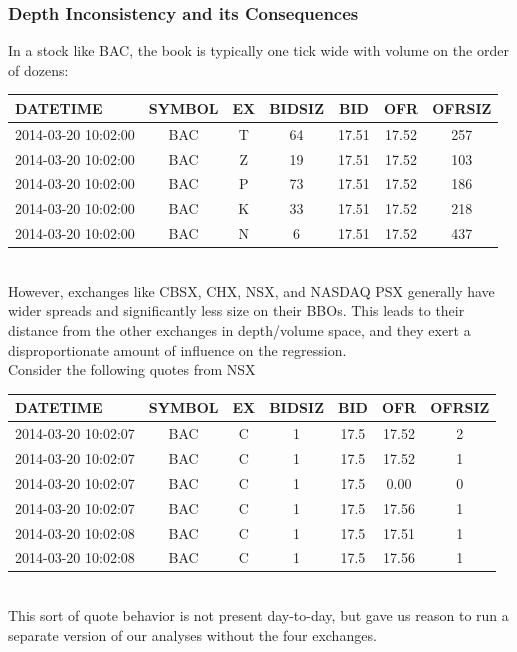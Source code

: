 \documentclass{article}
\begin{document}
\subsubsection{Depth Inconsistency and its Consequences}
In a stock like BAC, the book is typically one tick wide with volume on the order of dozens:\\
\begin{tabular}{ | l | c | c | c | c | c | c |}
\hline
DATETIME & SYMBOL & EX & BIDSIZ  & BID   & OFR & OFRSIZ \\ \hline 
2014-03-20 10:02:00   & BAC & T  &   64& 17.51& 17.52&    257         \\ \hline 
2014-03-20 10:02:00   & BAC & Z  &   19 &17.51& 17.52&    103         \\ \hline 
2014-03-20 10:02:00   & BAC & P  &   73 &17.51& 17.52&    186         \\ \hline 
2014-03-20 10:02:00   & BAC & K  &   33 &17.51& 17.52&    218         \\ \hline 
2014-03-20 10:02:00   & BAC & N  &    6 &17.51 &17.52&    437         \\ \hline 
\end{tabular}\\

However, exchanges like CBSX, CHX, NSX, and NASDAQ PSX generally have wider spreads and significantly less size on their BBOs. This leads to their distance from the other exchanges in depth/volume space, and they exert a disproportionate amount of influence on the regression.\\

Consider the following quotes from NSX\\

\begin{tabular}{ | l | c | c | c | c | c | c |}
\hline
DATETIME & SYMBOL & EX & BIDSIZ  & BID   & OFR & OFRSIZ \\ \hline 
2014-03-20 10:02:07  &   BAC &  C  &     1 & 17.5 & 17.52  &     2   \\ \hline 
2014-03-20 10:02:07  &   BAC &  C  &     1 & 17.5 & 17.52  &     1   \\ \hline 
2014-03-20 10:02:07  &   BAC &  C  &     1 & 17.5 &  0.00   &    0    \\ \hline 
2014-03-20 10:02:07  &   BAC &  C  &     1 & 17.5 & 17.56  &     1    \\ \hline 
2014-03-20 10:02:08  &   BAC &  C  &     1 & 17.5 & 17.51  &     1    \\ \hline 
2014-03-20 10:02:08  &   BAC &  C  &     1 & 17.5 & 17.56  &     1 \\ \hline 
\end{tabular}\\

This sort of quote behavior is not present day-to-day, but gave us reason to run a separate version of our analyses without the four exchanges.\\
\end{document}
